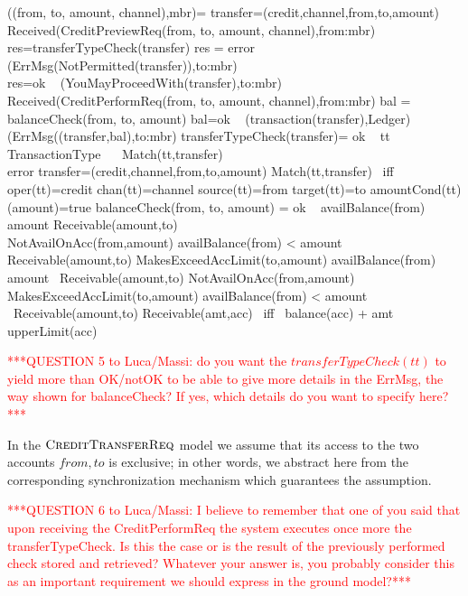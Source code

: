 \begin{asm}
((from, to, amount, channel),mbr)=\+
\LET transfer=(credit,channel,from,to,amount) \\
\IF  Received(CreditPreviewReq(from, to, amount, channel),from:mbr) \THEN \+  
   \LET res=transferTypeCheck(transfer)  \+
      \IF res = error \THEN ~ (ErrMsg(NotPermitted(transfer)),to:mbr)\\
      \IF res=ok \THEN ~ (YouMayProceedWith(transfer),to:mbr)\dec\-
\IF  Received(CreditPerformReq(from, to, amount, channel),from:mbr) \THEN \+     
      \LET bal = balanceCheck(from, to, amount) \+
           \IF bal=ok \THEN ~ (transaction(transfer),Ledger)\+
              \ELSE ~ (ErrMsg((transfer,bal),to:mbr)\dec\dec\-
\WHERE \+
  transferTypeCheck(transfer)=\+
          ok \IF ~ \FORSOME tt \in TransactionType ~~  Match(tt,transfer)\\
          error \ELSE \-
  \LET transfer=(credit,channel,from,to,amount) \+
       Match(tt,transfer) \mbox{ iff } oper(tt)=credit \AND chan(tt)=channel \AND \+
             source(tt)=from \AND target(tt)=to \AND amountCond(tt)(amount)=true\dec\-
  balanceCheck(from, to, amount) = \+
        ok ~ \IF availBalance(from) \geq amount \AND Receivable(amount,to)\\
        NotAvailOnAcc(from,amount) \+
           \IF availBalance(from) < amount \AND Receivable(amount,to)\-
        MakesExceedAccLimit(to,amount) \+
          \IF availBalance(from) \geq amount \AND~\NOT Receivable(amount,to)\-
        NotAvailOnAcc(from,amount) \AND MakesExceedAccLimit(to,amount)  \+
          \IF availBalance(from) < amount \AND~\NOT Receivable(amount,to)\dec\-
    Receivable(amt,acc) \mbox{ iff } balance(acc) + amt \leq upperLimit(acc)
\end{asm}

\vspace{12pt}
\textcolor{red}{***QUESTION 5 to Luca/Massi: do you want the $transferTypeCheck(tt)$ to yield more than OK/notOK to be able to give more details in the ErrMsg, the way shown for balanceCheck? If yes, which details do you want to specify here?***}
\vspace{12pt}

In the $\hbox{\sc CreditTransferReq}$ model we assume that its access to the two accounts $from, to$ is exclusive; in other words, we abstract here from the corresponding synchronization mechanism which guarantees the assumption.

\vspace{12pt}
\textcolor{red}{***QUESTION 6 to Luca/Massi: I believe to remember that one of you said that upon receiving the CreditPerformReq the system executes once more the transferTypeCheck. Is this the case or is the result of the previously performed check stored and retrieved? Whatever your answer is, you probably consider this as an important requirement we should express in the ground model?***}
\vspace{12pt}

